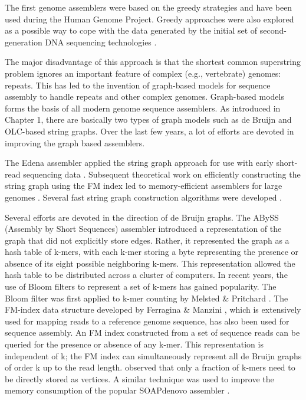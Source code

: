 The first genome assemblers \citep{sutton1995tigr, Green99phrapdocumentation} were based on the greedy strategies and have been used during the Human Genome Project.
Greedy approaches were also explored as a possible way to cope with the data generated by the initial set
of second-generation DNA sequencing technologies \citep{warren2006assembling, jeck2007extending}.

The major disadvantage of this approach is that the shortest common superstring problem ignores an important feature of complex (e.g.,
vertebrate) genomes: repeats. This has led to the invention of graph-based models for sequence assembly to handle repeats and other complex genomes.
Graph-based models forms the basis of all modern genome sequence assemblers. 
As introduced in Chapter 1, there are basically two types of graph models such as de Bruijn and OLC-based string graphs.
Over the last few years, a lot of efforts are devoted in improving the graph based assemblers. 

The Edena assembler applied the string graph approach for use with
early short-read sequencing data \citep{hernandez2008novo}. Subsequent theoretical work on efficiently constructing the
string graph using the FM index \citep{simpson2010efficient} led to memory-efficient assemblers for large genomes \citep{li2012exploring, simpson2012efficient}.
Several fast string graph construction algorithms were developed \citep{dinh2011memory, gonnella2012readjoiner, ben2014string}.
 
Several efforts are devoted in the direction of de Bruijn graphs.
The ABySS (Assembly by Short Sequences) assembler \citep{simpson2009abyss} introduced a representation of
the graph that did not explicitly store edges. Rather, it represented the graph as a hash table of
k-mers, with each k-mer storing a byte representing the presence or absence of its eight possible
neighboring k-mers. This representation allowed the hash table to be distributed across a cluster
of computers. In recent years, the use of Bloom filters \citep{bloom1970space} to represent a set of k-mers has gained popularity.
The Bloom filter was first applied to k-mer counting by Melsted & Pritchard \citep{melsted2011efficient}. 
The FM-index data structure developed by Ferragina & Manzini \citep{ferragina2000opportunistic}, which is extensively
used for mapping reads to a reference genome sequence, has also been used for
sequence assembly. An FM index constructed from a set of sequence reads can be queried for the
presence or absence of any k-mer. This representation is independent of k; the FM index can
simultaneously represent all de Bruijn graphs of order k up to the read length.
\cite{ye2012exploiting} observed that only a fraction of k-mers need to be directly stored as vertices. A similar
technique was used to improve the memory consumption of the popular SOAPdenovo assembler \citep{luo2012soapdenovo2}.

